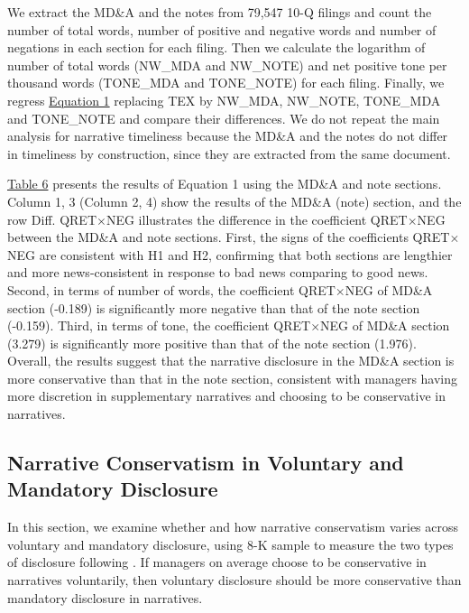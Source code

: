 \documentclass[a4paper]{article}
\begin{document}
\begin{spacing}{2}
We extract the MD\&A and the notes from 79,547 10-Q filings and count the number of total words, number of positive and negative words and number of negations in each section for each filing. Then we calculate the logarithm of number of total words (NW\_MDA and NW\_NOTE) and net positive tone per thousand words (TONE\_MDA and TONE\_NOTE) for each filing. Finally, we regress \hyperref[eq1]{Equation 1} replacing TEX by NW\_MDA, NW\_NOTE, TONE\_MDA and TONE\_NOTE and compare their differences. We do not repeat the main analysis for narrative timeliness because the MD\&A and the notes do not differ in timeliness by construction, since they are extracted from the same document.

\hyperref[T6]{Table 6} presents the results of Equation 1 using the MD\&A and note sections. Column 1, 3 (Column 2, 4) show the results of the MD\&A (note) section, and the row Diff. QRET$\times$NEG illustrates the difference in the coefficient QRET$\times$NEG between the MD\&A and note sections. First, the signs of the coefficients QRET$\times$NEG are consistent with H1 and H2, confirming that both sections are lengthier and more news-consistent in response to bad news comparing to good news. Second, in terms of number of words, the coefficient QRET$\times$NEG of MD\&A section (-0.189) is significantly more negative than that of the note section (-0.159). Third, in terms of tone, the coefficient QRET$\times$NEG of MD\&A section (3.279) is significantly more positive than that of the note section (1.976). Overall, the results suggest that the narrative disclosure in the MD\&A section is more conservative than that in the note section, consistent with managers having more discretion in supplementary narratives and choosing to be conservative in narratives.

\subsection{Narrative Conservatism in Voluntary and Mandatory Disclosure}
In this section, we examine whether and how narrative conservatism varies across voluntary and mandatory disclosure, using 8-K sample to measure the two types of disclosure following . If managers on average choose to be conservative in narratives voluntarily, then voluntary disclosure should be more conservative than mandatory disclosure in narratives. 


\end{spacing}
\end{document}
